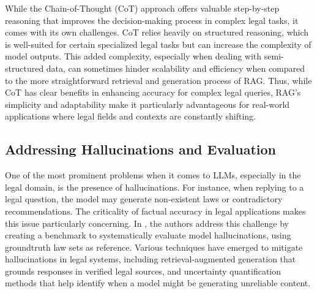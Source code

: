 While the Chain-of-Thought (CoT) approach offers valuable step-by-step reasoning that 
improves the decision-making process in complex legal tasks, it comes with its own challenges. 
CoT relies heavily on structured reasoning, which is well-suited for certain specialized legal tasks 
but can increase the complexity of model outputs. This added complexity, especially when dealing with 
semi-structured data, can sometimes hinder scalability and efficiency when compared to the more straightforward 
retrieval and generation process of RAG. Thus, while CoT has clear benefits in enhancing accuracy for complex 
legal queries, RAG's simplicity and adaptability make it particularly advantageous for real-world applications 
where legal fields and contexts are constantly shifting.


\subsection{Addressing Hallucinations and Evaluation}
One of the most prominent problems when it comes to LLMs, especially in the legal domain, 
is the presence of hallucinations. For instance, when replying to a legal question, 
the model may generate non-existent laws or contradictory recommendations. 
The criticality of factual accuracy in legal applications makes this issue particularly concerning.
In \cite{hu2025finetuninglargelanguagemodels}, the authors address this challenge by creating a 
benchmark to systematically evaluate model hallucinations, using groundtruth law sets as reference.
Various techniques have emerged to mitigate hallucinations in legal systems, including retrieval-augmented
generation that grounds responses in verified legal sources, and uncertainty quantification methods
that help identify when a model might be generating unreliable content.

